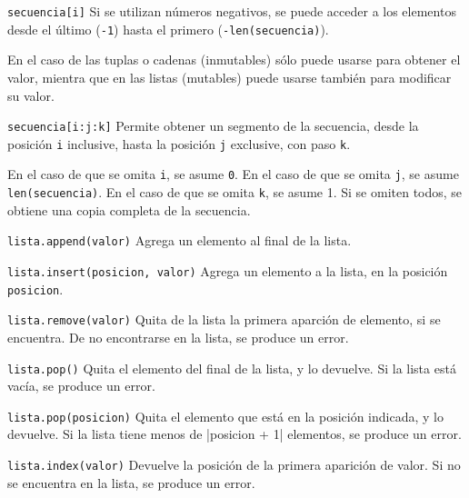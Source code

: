 \begin{referencia_python}
\begin{sintaxis}{\lstinline!secuencia[i]!}
Si se utilizan números negativos, se puede acceder a los
elementos desde el último (\lstinline!-1!) hasta el primero
(\lstinline!-len(secuencia)!).

En el caso de las tuplas o cadenas (inmutables) sólo puede usarse para obtener el
valor, mientra que en las listas (mutables) puede usarse también para
modificar su valor.
\end{sintaxis}

\begin{sintaxis}{\lstinline!secuencia[i:j:k]!}
Permite obtener un segmento de la secuencia, desde la posición \lstinline!i!
inclusive, hasta la posición \lstinline!j! exclusive, con paso
\lstinline!k!.

En el caso de que se omita \lstinline!i!, se asume \lstinline!0!.  En el
caso de que se omita \lstinline!j!, se asume \lstinline!len(secuencia)!.
En el caso de que se omita \lstinline!k!, se asume 1. Si
se omiten todos, se obtiene una copia completa de la secuencia.
\end{sintaxis}

\begin{sintaxis}{\lstinline!lista.append(valor)!}
Agrega un elemento al final de la lista.
\end{sintaxis}

\begin{sintaxis}{\lstinline!lista.insert(posicion, valor)!}
Agrega un elemento a la lista, en la posición \lstinline!posicion!.
\end{sintaxis}

\begin{sintaxis}{\lstinline!lista.remove(valor)!}
Quita de la lista la primera aparción de elemento, si se encuentra.  De no
encontrarse en la lista, se produce un error.
\end{sintaxis}

\begin{sintaxis}{\lstinline!lista.pop()!}
Quita el elemento del final de la lista, y lo devuelve. Si la lista está
vacía, se produce un error.
\end{sintaxis}

\begin{sintaxis}{\lstinline!lista.pop(posicion)!}
Quita el elemento que está en la posición indicada, y lo devuelve. Si la
lista tiene menos de |posicion + 1| elementos, se produce un error.
\end{sintaxis}

\begin{sintaxis}{\lstinline!lista.index(valor)!}
Devuelve la posición de la primera aparición de valor.  Si no se encuentra
en la lista, se produce un error.
\end{sintaxis}


\end{referencia_python}
